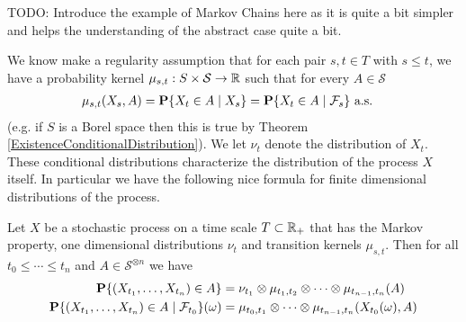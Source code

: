 TODO: Introduce the example of Markov Chains here as it is quite a bit
simpler and helps the
understanding of the abstract case quite a bit.

We know make a regularity assumption that for each pair $s,t \in T$
with $s \leq t$, we
have a probability kernel $\mu_{s,t} : S \times \mathcal{S} \to
\reals$ such that for every $A \in \mathcal{S}$
\begin{align*}
\mu_{s,t}(X_s, A) &= \cprobability{X_s}{X_t \in A} =
\cprobability{\mathcal{F}_s}{X_t \in A} \text{ a.s.}
\end{align*}
(e.g. if $S$ is a Borel space then this is true by Theorem
\ref{ExistenceConditionalDistribution}).
We let $\nu_t$ denote the distribution of $X_t$.
These conditional distributions characterize the distribution of the
process $X$ itself.  In particular we have the following nice formula
for finite dimensional distributions of the process.
\begin{lem}\label{MarkovDistributions}Let $X$ be a stochastic process
  on a time scale $T \subset \reals_+$ that has the Markov property,
  one dimensional distributions $\nu_t$ and transition kernels
  $\mu_{s,t}$.  Then for all $t_0 \leq \cdots \leq t_n$ and $A \in
  \mathcal{S}^{\otimes n}$ we have
\begin{align*}
\probability{(X_{t_1}, \dots, X_{t_n}) \in A} 
&= \nu_{t_1} \otimes
\mu_{t_1, t_2} \otimes \cdots \otimes \mu_{t_{n-1},t_n}(A) \\
\cprobability{\mathcal{F}_{t_0}}{(X_{t_1}, \dots, X_{t_n}) \in
  A}(\omega) 
&= \mu_{t_0, t_1} \otimes \cdots \otimes \mu_{t_{n-1},t_n}(X_{t_0}(\omega),A) \\
\end{align*}
\end{lem}
